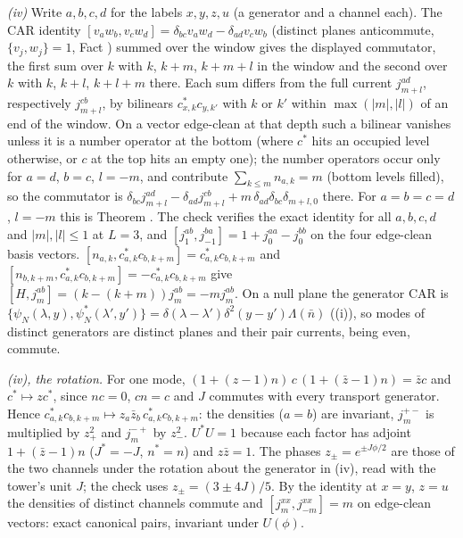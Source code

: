 \emph{(iv)} Write $a, b, c, d$ for the labels $x, y, z, u$ (a generator and a channel each). The CAR identity $[v_{a}w_{b}, v_{c}w_{d}] = \delta_{bc}v_{a}w_{d} - \delta_{ad}v_{c}w_{b}$ (distinct planes anticommute, $\{v_{j}, w_{j}\} = 1$, Fact ) summed over the window gives the displayed commutator, the first sum over $k$ with $k$, $k + m$, $k + m + l$ in the window and the second over $k$ with $k$, $k + l$, $k + l + m$ there. Each sum differs from the full current $j^{ad}_{m+l}$, respectively $j^{cb}_{m+l}$, by bilinears $c_{x,k}^{*}c_{y,k'}$ with $k$ or $k'$ within $\max(|m|, |l|)$ of an end of the window. On a vector edge-clean at that depth such a bilinear vanishes unless it is a number operator at the bottom (where $c^{*}$ hits an occupied level otherwise, or $c$ at the top hits an empty one); the number operators occur only for $a = d$, $b = c$, $l = -m$, and contribute $\sum_{k \le m}n_{a,k} = m$ (bottom levels filled), so the commutator is $\delta_{bc}j^{ad}_{m+l} - \delta_{ad}j^{cb}_{m+l} + m\,\delta_{ad}\delta_{bc}\delta_{m+l,0}$ there. For $a = b = c = d$, $l = -m$ this is Theorem . The check verifies the exact identity for all $a, b, c, d$ and $|m|, |l| \le 1$ at $L = 3$, and $[j^{ab}_{1}, j^{ba}_{-1}] = 1 + j^{aa}_{0} - j^{bb}_{0}$ on the four edge-clean basis vectors. $[n_{a,k}, c_{a,k}^{*}c_{b,k+m}] = c_{a,k}^{*}c_{b,k+m}$ and $[n_{b,k+m}, c_{a,k}^{*}c_{b,k+m}] = -c_{a,k}^{*}c_{b,k+m}$ give $[H, j^{ab}_{m}] = (k - (k + m))j^{ab}_{m} = -mj^{ab}_{m}$. On a null plane the generator CAR is $\{\psi_{N}(\lambda, y), \psi_{N}^{*}(\lambda', y')\} = \delta(\lambda - \lambda')\delta^{2}(y - y')\Lambda(\bar n)$ ((i)), so modes of distinct generators are distinct planes and their pair currents, being even, commute.

\emph{(iv), the rotation.} For one mode, $(1 + (z - 1)n)\,c\,(1 + (\bar z - 1)n) = \bar z c$ and $c^{*} \mapsto zc^{*}$, since $nc = 0$, $cn = c$ and $J$ commutes with every transport generator. Hence $c_{a,k}^{*}c_{b,k+m} \mapsto z_{a}\bar z_{b}\,c_{a,k}^{*}c_{b,k+m}$: the densities ($a = b$) are invariant, $j^{+-}_{m}$ is multiplied by $z_{+}^{2}$ and $j^{-+}_{m}$ by $z_{-}^{2}$. $U^{*}U = 1$ because each factor has adjoint $1 + (\bar z - 1)n$ ($J^{*} = -J$, $n^{*} = n$) and $z\bar z = 1$. The phases $z_{\pm} = e^{\pm J\phi/2}$ are those of the two channels under the rotation about the generator in (iv), read with the tower's unit $J$; the check uses $z_{\pm} = (3 \pm 4J)/5$. By the identity at $x = y$, $z = u$ the densities of distinct channels commute and $[j^{xx}_{m}, j^{xx}_{-m}] = m$ on edge-clean vectors: exact canonical pairs, invariant under $U(\phi)$.

